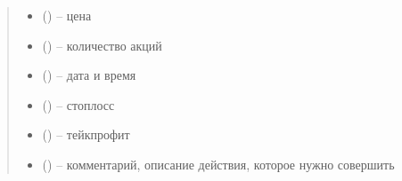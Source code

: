 \documentclass[letterpaper,10pt,english,openany,oneside]{sphinxmanual}
\begin{document}
\begin{fulllineitems}
\begin{fulllineitems}
\begin{quote}
\begin{description}
\begin{itemize}
\item {} 
\sphinxAtStartPar
{} (\sphinxstyleliteralemphasis{\sphinxupquote{{[}}}\sphinxstyleliteralemphasis{\sphinxupquote{{]}}}) – цена

\item {} 
\sphinxAtStartPar
{} (\sphinxstyleliteralemphasis{\sphinxupquote{{[}}}\sphinxstyleliteralemphasis{\sphinxupquote{{]}}}) – количество акций

\item {} 
\sphinxAtStartPar
{} (\sphinxstyleliteralemphasis{\sphinxupquote{{[}}}\sphinxstyleliteralemphasis{\sphinxupquote{{]}}}) – дата и время

\item {} 
\sphinxAtStartPar
{} (\sphinxstyleliteralemphasis{\sphinxupquote{{[}}}\sphinxstyleliteralemphasis{\sphinxupquote{{]}}}) – стоп\sphinxhyphen{}лосс

\item {} 
\sphinxAtStartPar
{} (\sphinxstyleliteralemphasis{\sphinxupquote{{[}}}\sphinxstyleliteralemphasis{\sphinxupquote{{]}}}) – тейк\sphinxhyphen{}профит

\item {} 
\sphinxAtStartPar
{} (\sphinxstyleliteralemphasis{\sphinxupquote{{[}}}\sphinxstyleliteralemphasis{\sphinxupquote{{]}}}) – комментарий, описание действия, которое нужно совершить

\end{itemize}

\end{description}\end{quote}

\end{fulllineitems}


\end{fulllineitems}
\end{document}
